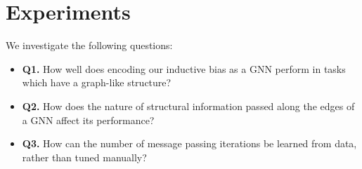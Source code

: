 \section{Experiments}
\label{sec:experiments}
We investigate the following questions:
\begin{itemize}[noitemsep,topsep=0pt]
\item \textbf{Q1.} How well does encoding our inductive bias as a GNN perform in tasks which have a graph-like structure?
\item \textbf{Q2.} How does the nature of structural information passed along the edges of a GNN affect its performance?
\item \textbf{Q3.} How can the number of message passing iterations be learned from data, rather than tuned manually?
\end{itemize}

